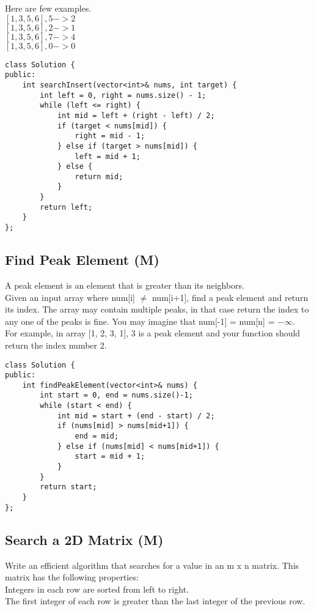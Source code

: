 Here are few examples.\\
$[1,3,5,6], 5 -> 2$\\
$[1,3,5,6], 2 -> 1$\\
$[1,3,5,6], 7 -> 4$\\
$[1,3,5,6], 0 -> 0$\\

\begin{lstlisting}
class Solution {
public:
    int searchInsert(vector<int>& nums, int target) {
        int left = 0, right = nums.size() - 1;
        while (left <= right) {
            int mid = left + (right - left) / 2;
            if (target < nums[mid]) {
                right = mid - 1;
            } else if (target > nums[mid]) {
                left = mid + 1;
            } else {
                return mid;
            }
        }
        return left;
    }
};
\end{lstlisting}


\subsection{Find Peak Element (M)}
A peak element is an element that is greater than its neighbors.\\

Given an input array where num[i] $\neq$ num[i+1], find a peak element and return its index.
The array may contain multiple peaks, in that case return the index to any one of the peaks is fine.
You may imagine that num[-1] = num[n] = $-\infty$.\\

For example, in array [1, 2, 3, 1], 3 is a peak element and your function should return the index number 2.\\

\begin{lstlisting}
class Solution {
public:
    int findPeakElement(vector<int>& nums) {
        int start = 0, end = nums.size()-1;
        while (start < end) {
            int mid = start + (end - start) / 2;
            if (nums[mid] > nums[mid+1]) {
                end = mid;
            } else if (nums[mid] < nums[mid+1]) {
                start = mid + 1;
            }
        }
        return start;
    }
};
\end{lstlisting}


\subsection{Search a 2D Matrix (M)}
Write an efficient algorithm that searches for a value in an m x n matrix. This matrix has the following properties:\\
    Integers in each row are sorted from left to right.\\
    The first integer of each row is greater than the last integer of the previous row.\\

